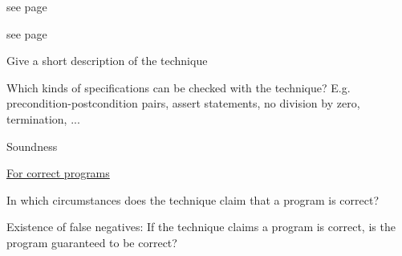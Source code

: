 \documentclass[a4paper]{article}
\begin{document}
\begin{minipage}[t]{0.16\linewidth}
	\raggedright
 \begin{betterlist}
     \item see page \pageref{pdf:ranking_function_synthesis}
 \end{betterlist}
\end{minipage}
\begin{minipage}[t]{0.16\linewidth}
	\raggedright
 \begin{betterlist}
     \item see page \pageref{pdf:terminator}
 \end{betterlist}
\end{minipage}
\begin{minipage}[t]{0.16\linewidth}
	\raggedright
	\begin{betterlist}
		\item Give a short description of the technique
		\item Which kinds of specifications can be checked with the technique? E.g. precondition-postcondition pairs, assert statements, no division by zero, termination, ...

		\item \alert{Soundness}
		\begin{betterlist}
			\item \underline{For correct programs}
			\begin{betterlist}
				\item In which circumstances does the technique claim that a program is correct?

				\item Existence of false negatives: If the technique claims a program is correct, is the program guaranteed to be correct?


\end{betterlist}
\end{betterlist}
\end{betterlist}
\end{minipage}
\end{document}
